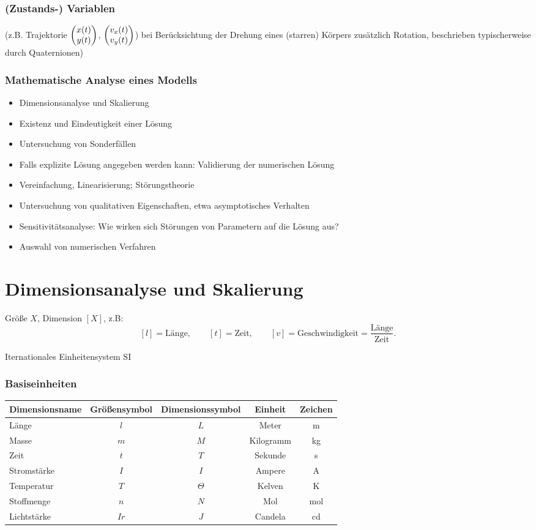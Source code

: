 \subsubsection*{(Zustands-) Variablen} (z.B. Trajektorie $\begin{pmatrix}x(t)\\y(t)\end{pmatrix}$,
$\begin{pmatrix}v_x(t)\\v_y(t)\end{pmatrix}$) bei Berücksichtung der Drehung eines (starren) Körpers
zusätzlich Rotation, beschrieben typischerweise durch Quaternionen)

\subsubsection*{Mathematische Analyse eines Modells}
\begin{itemize}
\item Dimensionsanalyse und Skalierung
\item Existenz und Eindeutigkeit einer Lösung
\item Untersuchung von Sonderfällen
\item Falls explizite Lösung angegeben werden kann: Validierung der numerischen
  Lösung
\item Vereinfachung, Linearisierung; Störungstheorie
\item Untersuchung von qualitativen Eigenschaften, etwa asymptotisches Verhalten
\item Sensitivitätsanalyse: Wie wirken sich Störungen von Parametern auf die
  Lösung aus?
\item Auswahl von numerischen Verfahren
\end{itemize}

\section{Dimensionsanalyse und Skalierung}
Größe $X$, Dimension $[X]$, z.B:
\[ [l] = \text{Länge}, \qquad [t] = \text{Zeit}, \qquad [v] =
  \text{Geschwindigkeit} = \frac{\text{Länge}}{\text{Zeit}}. \]

Iternationales Einheitensystem SI

\subsubsection*{Basiseinheiten}
\begin{center}
  \begin{tabular}{l|c|c|c|c}
    Dimensionsname & Größensymbol & Dimensionssymbol & Einheit & Zeichen \\
    \hline
    Länge & $l$ & $L$ & Meter & \si{\m} \\
    Masse & $m$ & $M$ & Kilogramm & \si{\kg} \\
    Zeit  & $t$ & $T$ & Sekunde & \si{\s} \\
    Stromstärke & $I$ & $I$ & Ampere & \si{\ampere} \\
    Temperatur & $T$ & $\Theta$ & Kelven & \si{\kelvin} \\
    Stoffmenge & $n$ & $N$ & Mol & \si{\mol} \\
    Lichtstärke & $Ir$ & $J$ & Candela & \si{\candela}
  \end{tabular}
\end{center}

